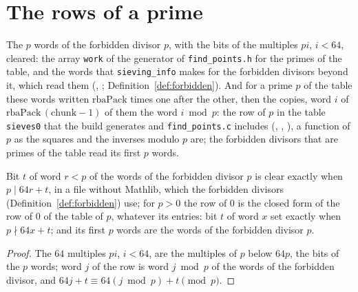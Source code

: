\section{The rows of a prime}\label{sec:primeRows}

\begin{definition}\label{def:sieves0}
  \leanok
  The $p$ words of the forbidden divisor $p$, with the bits of the multiples $p i$, $i < 64$,
  cleared: the array \verb|work| of the generator of \verb|find_points.h| for the primes of the
  table, and the words that \verb|sieving_info| makes for the forbidden divisors beyond it, which
  read them (, ;
  Definition~\ref{def:forbidden}). And for a prime $p$ of the table these words written
  $\mathrm{rbaPack}$ times one after the other, then the copies, word $i$ of
  $\mathrm{rbaPack}\,(\mathrm{chunk} - 1)$ of them the word $i \bmod p$: the row of $p$ in the table
  \verb|sieves0| that the build generates and \verb|find_points.c| includes
  (, ,
  ), a function of $p$ as the squares and the inverses modulo
  $p$ are; the forbidden divisors that are primes of the table read its first $p$ words.
\end{definition}

\begin{lemma}\label{lem:sieves0}
  \leanok
  Bit $t$ of word $r < p$ of the words of the forbidden divisor $p$ is clear exactly when $p \mid 64
  r + t$, in a file without Mathlib, which the forbidden divisors (Definition~\ref{def:forbidden})
  use; for $p > 0$ the row of $0$ is the closed form of the row of $0$ of the table of $p$, whatever
  its entries: bit $t$ of word $x$ set exactly when $p \nmid 64 x + t$; and its first $p$ words are
  the words of the forbidden divisor $p$.
\end{lemma}

\begin{proof}
  \leanok
  The $64$ multiples $p i$, $i < 64$, are the multiples of $p$ below $64 p$, the bits of the $p$
  words; word $j$ of the row is word $j \bmod p$ of the words of the forbidden divisor, and
  $64 j + t \equiv 64 (j \bmod p) + t \pmod p$.
\end{proof}

